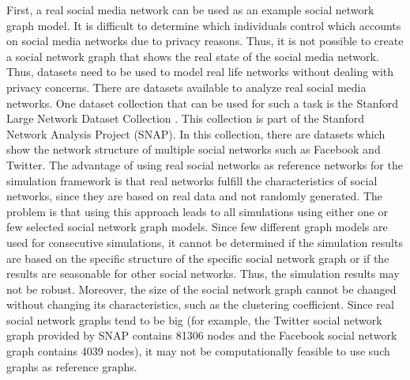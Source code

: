 First, a real social media network can be used as an example 
social network graph model. 
It is difficult to determine which individuals
control which accounts on social media networks due to privacy reasons.
Thus, it is not possible to create a social network graph that 
shows the real state of the social media network.
Thus, datasets need to be used to model real life networks without 
dealing with privacy concerns. There are datasets available to analyze
real social media networks. One dataset collection that can 
be used for such a task is the Stanford 
Large Network Dataset Collection \cite{snapnets}.
This collection is part of the Stanford Network Analysis Project (SNAP).
In this collection, there are datasets which show the network structure
of multiple social networks such as Facebook and Twitter.
The advantage of using real social networks as reference networks
for the simulation framework is that real networks fulfill the 
characteristics of social networks, since they
are based on real data and not randomly generated. The problem
is that using this approach leads to all simulations using either
one or few selected social network graph models. Since 
few different graph models are used for consecutive simulations,
it cannot be determined if the simulation results are based on the 
specific structure of the specific social network graph or if the results 
are seasonable for other social networks. Thus, the simulation results
may not be robust. Moreover, the size of the social network graph 
cannot be changed without changing its characteristics, such as 
the clustering coefficient. Since real social network graphs tend to be 
big (for example, the Twitter social network graph provided by SNAP
contains 81306 nodes and the Facebook social network graph contains 
4039 nodes), it may not be computationally feasible to use such graphs
as reference graphs.

